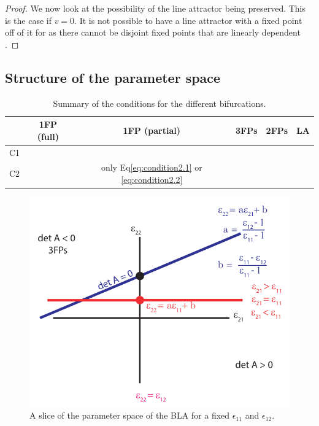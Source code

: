 \documentclass{article} %
\newcounter{ct}
\newcommand{\cmark}{\ding{51}}%
\newcommand{\xmark}{\ding{55}}%
\theoremstyle{definition}
\theoremstyle{remark}
\begin{document}
\begin{proof}
We now look at the possibility of the line attractor being preserved. 
This is the case if $v=0$.
It is not possible to have a line attractor with a fixed point off of it for as there cannot be disjoint fixed points that are linearly dependent \citep[Lemma 5.2]{morrison2016a}.
\end{proof}


\subsection{Structure of the parameter space}
\begin{table}[H]
\caption{Summary of the conditions for the different bifurcations.}\label{tab:bifs}
\centering
\bgroup
\def\arraystretch{1.52}
\begin{tabular}{|c||c|c|c|c|c|}
\hline
& 1FP (full) 		& 1FP (partial) & 3FPs & 2FPs & LA  \\\hline \hline
C1 & \cmark	 	& \xmark 	 & \cmark & \xmark & \xmark \\\hline 
C2 & \xmark 		& only Eq\ref{eq:condition2.1} or \ref{eq:condition2.2}  	 & \cmark & \cmark& \xmark \\\hline 
\end{tabular}
\egroup
\end{table}

\begin{figure}[H]
  \centering
  \includegraphics[width=\textwidth]{bla_parameter_space.pdf}
  \caption{A slice of the parameter space of the BLA for a fixed $\epsilon_{11}$ and $\epsilon_{12}$. %
  }
  \label{fig:blaparameterspace}
\end{figure}
\end{document}
